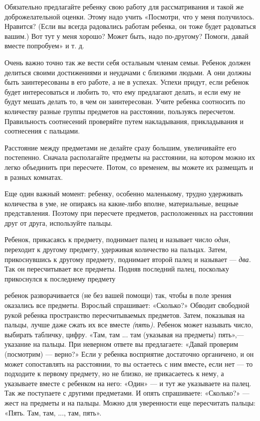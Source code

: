 \documentclass[a5paper]{book}
\renewcommand{\emph}[1]{\textit{#1}}
\begin{document}
Обязательно предлагайте ребенку свою работу для рассматривания и такой
же доброжелательной оценки. Этому надо учить «Посмотри, что у меня
получилось. Нравится? (Если вы всегда радовались работам ребенка, он
тоже будет радоваться вашим.) Вот тут у меня хорошо? Может быть, надо
по-другому? Помоги, давай вместе попробуем» и т. д.

Очень важно точно так же вести себя остальным членам семьи. Ребенок
должен делиться своими достижениями и неудачами с близкими людьми. А они
должны быть заинтересованы в его работе, а не в успехах. Успехи придут,
если ребенок будет интересоваться и любить то, что ему предлагают
делать, и если ему не будут мешать делать то, в чем он заинтересован.
Учите ребенка соотносить по количеству разные группы предметов на
расстоянии, пользуясь пересчетом. Правильность соотнесений проверяйте
путем накладывания, прикладывания и соотнесения с пальцами.

Расстояние между предметами не делайте сразу большим, увеличивайте его
постепенно. Сначала располагайте предметы на расстоянии, на котором
можно их легко объединить при пересчете. Потом, со временем, вы можете
их размещать и в разных комнатах.

Еще один важный момент: ребенку, особенно маленькому, трудно удерживать
количества в уме, не опираясь на какие-либо вполне, материальные, вещные
представления. Поэтому при пересчете предметов, расположенных на
расстоянии друг от друга, используйте пальцы.

Ребенок, прикасаясь к предмету, поднимает палец и называет число
\emph{один}, переходит к другому предмету, удерживая количество на
пальцах\textsc{.} Затем, прикоснувшись к другому предмету, поднимает
второй палец и называет --- \emph{два.} Так он пересчитывает все
предметы. Подняв последний палец, поскольку прикоснулся к последнему
предмету

ребенок разворачивается (не без вашей помощи) так, чтобы в поле зрения
оказались все предметы. Взрослый спрашивает: «Сколько?» Обводит
свободной рукой ребенка пространство пересчитываемых предметов. Затем,
показывая на пальцы, лучше даже сжать их все вместе \emph{(пять).}
Ребенок может называть число, выбирать табличку, цифру. «Там, там ...
там (указывая на предметы) пять»,--- указание на пальцы. При неверном
ответе вы предлагаете: «Давай проверим (посмотрим) --- верно?» Если у
ребенка восприятие достаточно органичено, и он может сопоставлять на
расстоянии, то вы остаетесь с ним вместе\textbf{,} если нет --- то
подходите к первому предмету, но не близко, не прикасаетесь к нему, а
указываете вместе с ребенком на него: «Один» --- и тут же указываете на
палец. Так же поступаете с другими предметами. И опять спрашиваете:
«Сколько?» --- жест на предметы и на пальцы. Можно для уверенности еще
пересчитать пальцы: «Пять. Там, там, ..., там, пять».
\end{document}
